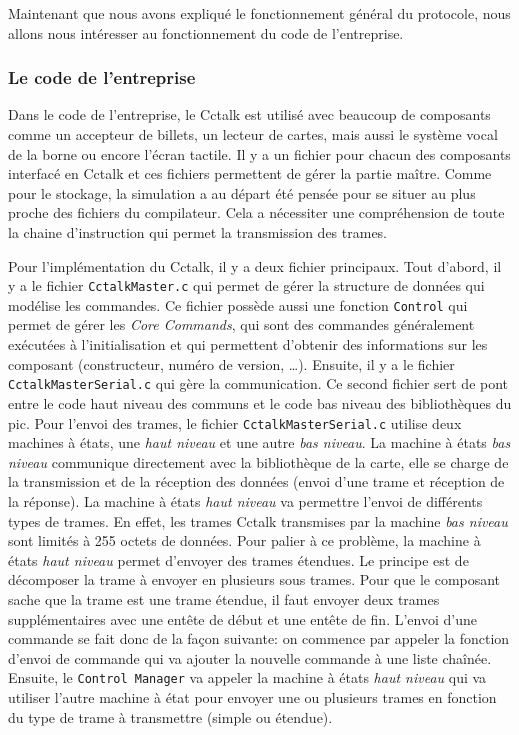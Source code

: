 \documentclass[a4paper]{article}
\begin{document}
Maintenant que nous avons expliqué le fonctionnement général du protocole, nous
allons nous intéresser au fonctionnement du code de l'entreprise.

\subsubsection{Le code de l'entreprise}

Dans le code de l'entreprise, le Cctalk est utilisé avec beaucoup de composants
comme un accepteur de billets, un lecteur de cartes, mais aussi le système vocal
de la borne ou encore l'écran tactile. Il y a un fichier pour chacun des
composants interfacé en Cctalk et ces fichiers permettent de gérer la partie
maître. Comme pour le stockage, la simulation a au départ été pensée pour se
situer au plus proche des fichiers du compilateur. Cela a nécessiter une
compréhension de toute la chaine d'instruction qui permet la transmission des
trames.

Pour l'implémentation du Cctalk, il y a deux fichier principaux. Tout d'abord,
il y a le fichier \verb|CctalkMaster.c| qui permet de gérer la structure de
données qui modélise les commandes. Ce fichier possède aussi une fonction
\verb|Control| qui permet de gérer les \textit{Core Commands}, qui sont des
commandes généralement exécutées à l'initialisation et qui permettent d'obtenir
des informations sur les composant (constructeur, numéro de version, \dots).
Ensuite, il y a le fichier \verb|CctalkMasterSerial.c| qui gère la
communication. Ce second fichier sert de pont entre le code haut niveau des
communs et le code bas niveau des bibliothèques du \gls{pic}. Pour l'envoi des
trames, le fichier \verb|CctalkMasterSerial.c| utilise deux machines à états,
une \textit{haut niveau} et une autre \textit{bas niveau}. La machine à états
\textit{bas niveau} communique directement avec la bibliothèque de la carte,
elle se charge de la transmission et de la réception des données (envoi d'une
trame et réception de la réponse). La machine à états \textit{haut niveau} va
permettre l'envoi de différents types de trames. En effet, les trames Cctalk
transmises par la machine \textit{bas niveau} sont limités à 255 octets de
données. Pour palier à ce problème, la machine à états \textit{haut niveau}
permet d'envoyer des trames étendues. Le principe est de décomposer la trame à
envoyer en plusieurs sous trames. Pour que le composant sache que la trame est
une trame étendue, il faut envoyer deux trames supplémentaires avec une entête
de début et une entête de fin. L'envoi d'une commande se fait donc de la façon
suivante: on commence par appeler la fonction d'envoi de commande qui va ajouter
la nouvelle commande à une liste chaînée. Ensuite, le \verb|Control Manager| va
appeler la machine à états \textit{haut niveau} qui va utiliser l'autre machine
à état pour envoyer une ou plusieurs trames en fonction du type de trame à
transmettre (simple ou étendue).
\end{document}
